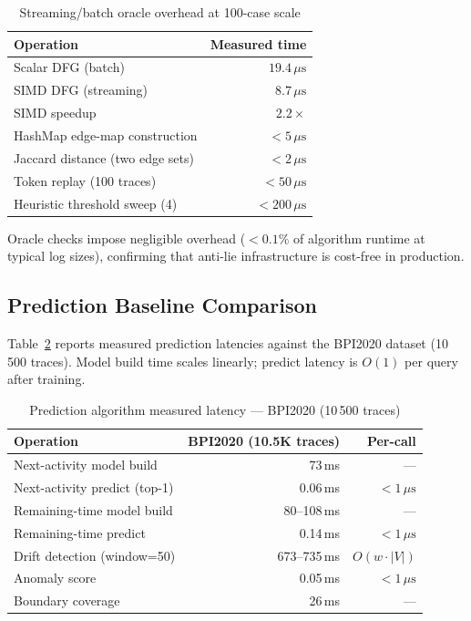 \documentclass[12pt,a4paper]{article}
\begin{document}
\begin{table}[H]
  \centering
  \caption{Streaming/batch oracle overhead at 100-case scale}
  \label{tab:oracle-overhead}
  \begin{tabular}{lr}
    \toprule
    \textbf{Operation} & \textbf{Measured time} \\
    \midrule
    Scalar DFG (batch)          & $19.4\,\mu\text{s}$ \\
    SIMD DFG (streaming)        & $8.7\,\mu\text{s}$ \\
    SIMD speedup                & $2.2\times$ \\
    HashMap edge-map construction     & $< 5\,\mu\text{s}$ \\
    Jaccard distance (two edge sets)  & $< 2\,\mu\text{s}$ \\
    Token replay (100 traces)         & $< 50\,\mu\text{s}$ \\
    Heuristic threshold sweep (4)     & $< 200\,\mu\text{s}$ \\
    \bottomrule
  \end{tabular}
\end{table}

Oracle checks impose negligible overhead ($< 0.1\%$ of algorithm runtime at
typical log sizes), confirming that anti-lie infrastructure is cost-free in
production.

\subsection{Prediction Baseline Comparison}

Table~\ref{tab:prediction} reports measured prediction latencies against the
BPI2020 dataset (10\,500 traces). Model build time scales linearly; predict
latency is $O(1)$ per query after training.

\begin{table}[H]
  \centering
  \caption{Prediction algorithm measured latency --- BPI2020 (10\,500 traces)}
  \label{tab:prediction}
  \begin{tabular}{lrr}
    \toprule
    \textbf{Operation} & \textbf{BPI2020 (10.5K traces)} & \textbf{Per-call} \\
    \midrule
    Next-activity model build       & 73\,ms  & --- \\
    Next-activity predict (top-1)   & 0.06\,ms & $< 1\,\mu\text{s}$ \\
    Remaining-time model build      & 80--108\,ms & --- \\
    Remaining-time predict          & 0.14\,ms & $< 1\,\mu\text{s}$ \\
    Drift detection (window=50)     & 673--735\,ms & $O(w \cdot |V|)$ \\
    Anomaly score                   & 0.05\,ms & $< 1\,\mu\text{s}$ \\
    Boundary coverage               & 26\,ms  & --- \\
    \bottomrule
  \end{tabular}
\end{table}
\end{document}

